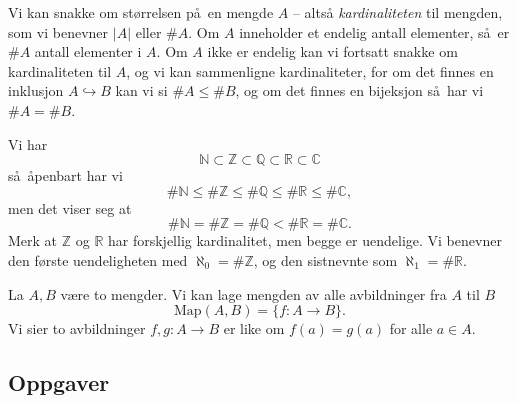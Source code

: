 \begin{definition}
    Vi kan snakke om størrelsen på en mengde $A$ -- altså \textit{kardinaliteten}
    til mengden, som vi benevner $|A|$ eller $\# A$.
    Om $A$ inneholder et endelig antall elementer,
    så er $\# A$ antall elementer i $A$.
    Om $A$ ikke er endelig kan vi fortsatt snakke om kardinaliteten til $A$,
    og vi kan sammenligne kardinaliteter,
    for om det finnes en inklusjon $A\hookrightarrow B$
    kan vi si $\# A\leq \# B$,
    og om det finnes en bijeksjon så har vi $\# A = \# B$.
\end{definition}

\begin{example}
    Vi har
    \[
        \mathbb N
        \subset \mathbb Z
        \subset \mathbb Q
        \subset \mathbb R
        \subset \mathbb C
    \]
    så åpenbart har vi
    \[
        \#\mathbb N
        \leq \#\mathbb Z
        \leq \#\mathbb Q
        \leq \#\mathbb R
        \leq \#\mathbb C,
    \]
    men det viser seg at
    \[
        \#\mathbb N
        = \#\mathbb Z
        = \#\mathbb Q
        < \#\mathbb R
        = \#\mathbb C.
    \]
    Merk at $\mathbb Z$ og $\mathbb R$ har forskjellig kardinalitet,
    men begge er uendelige.
    Vi benevner den første uendeligheten med $\aleph_0 = \#\mathbb Z$,
    og den sistnevnte som $\aleph_1 = \#\mathbb R$.
\end{example}

\begin{example}
    La $A, B$ være to mengder.
    Vi kan lage mengden av alle avbildninger fra $A$ til $B$
    \[
        \mathrm{Map}(A,B) = \{f\colon A\to B\}.
    \]
    Vi sier to avbildninger $f,g\colon A\to B$
    er like om $f(a) = g(a)$ for alle $a\in A$.
\end{example}

\subsection{Oppgaver}

